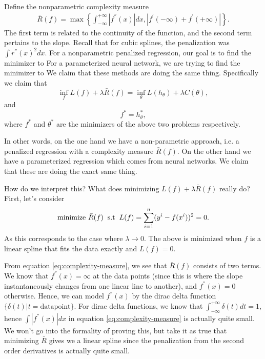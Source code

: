 \begin{theorem}
Define the nonparametric complexity measure
\begin{align}
	\bar{R}(f) = \max \left\{ \int_{-\infty}^{+\infty} |f^{''}(x)|dx, |f^{'}(-\infty) + f^{'}(+\infty)|\right\}. \label{eq:complexity-measure}
\end{align}
The first term is related to the continuity of the function, and the second term pertains to the slope. Recall that for cubic splines, the penalization was $\int r^{''}(x)^2 dx$. For a nonparametric penalized regression, our goal is to find the minimizer to
For a parameterized neural network, we are trying to find the minimizer to
We claim that these methods are doing the same thing. Specifically we claim that
$$\inf_{f} L(f) + \lambda \bar{R}(f) = \inf_{\theta} L(h_{\theta}) + \lambda C(\theta) , $$
and
$$f^{*} = h_{\theta}^{*},$$
where $f^{*}$ and $\theta^{*}$ are the minimizers of the above two problems respectively. 

In other words, on the one hand we have a non-parametric approach, i.e. a penalized regression with a complexity measure $\bar{R}(f)$. On the other hand we have a parameterized regression which comes from neural networks. We claim that these are doing the exact same thing.
\end{theorem}
How do we interpret this? What does minimizing $L(f) + \lambda \bar{R}(f)$ really do? First, let's consider
$$\text{minimize  }\bar{R}(f) \hspace{0.2cm} \text{s.t} \hspace{0.2cm} L(f) = \sum_{i=1}^{n}(y\sp{i}-f(x\sp{i}))^2 = 0.$$
As this corresponds to the case where $\lambda \rightarrow 0$. The above is minimized when $f$ is a linear spline that fits the data exactly and $L(f) = 0$. 
 
From equation \eqref{eq:complexity-measure}, we see that $\bar{R}(f)$ consists of two terms. We know that $f^{''}(x) = \infty$ at the data points (since this is where the slope instantaneously changes from one linear line to another), and $f^{''}(x) = 0$ otherwise.  Hence, we can model $f^{''}(x)$ by the dirac delta function $\{\delta(t) | t = \text{datapoint} \} $. For dirac delta functions, we know that $\int_{-\infty}^{+\infty} \delta(t) dt = 1$, hence $\int |f^{''}(x)|dx$ in equation \eqref{eq:complexity-measure} is actually quite small. We won't go into the formality of proving this, but take it as true that minimizing $\bar{R}$ gives we a linear spline since the penalization from the second order derivatives is actually quite small. 

